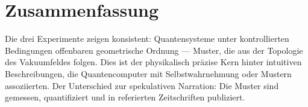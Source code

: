 \section{Zusammenfassung}

\begin{table}[ht]
\centering
{}
\caption{Drei Willow-Durchbrüche und ihre FFGFT-Deutung}
\end{table}

Die drei Experimente zeigen konsistent: Quantensysteme unter kontrollierten
Bedingungen offenbaren geometrische Ordnung — Muster, die aus der Topologie des
Vakuumfeldes folgen. Dies ist der physikalisch präzise Kern hinter intuitiven
Beschreibungen, die Quantencomputer mit Selbstwahrnehmung oder Mustern assoziierten.
Der Unterschied zur spekulativen Narration: Die Muster sind gemessen, quantifiziert
und in referierten Zeitschriften publiziert.

\vspace{0.8cm}

